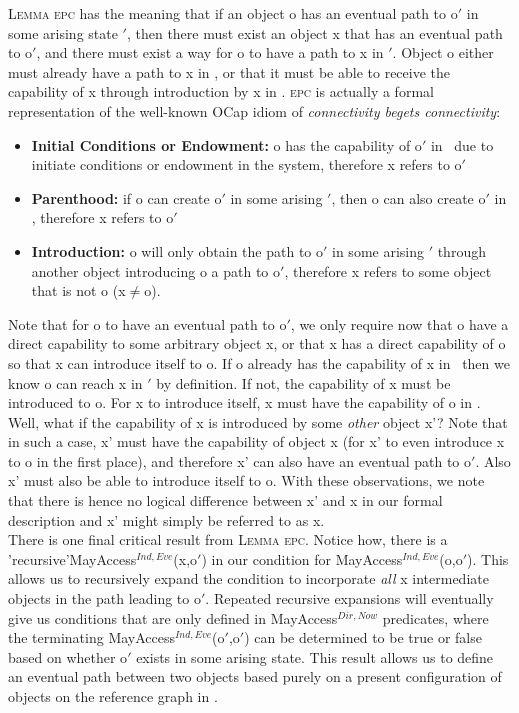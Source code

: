 \documentclass[a4paper,11pt,twoside]{article}
\newcommand{\loneq} {$\neq$}
\newcommand{\losigma}{\text{$\upsigma$}}
\begin{document}
\textsc{Lemma epc} has the meaning that if an object o has an eventual path to o$'$ in some arising state \losigma$'$, then there must exist an object x that has an eventual path to o$'$, and there must exist a way for o to have a path to x in \losigma$'$. Object o either must already have a path to x in \losigma, or that it must be able to receive the capability of x through introduction by x in \losigma. \textsc{epc} is actually a formal representation of the well-known OCap idiom of \textit{connectivity begets connectivity}:

\begin{itemize}
\item \textbf{Initial Conditions or Endowment:} o has the capability of o$'$ in \losigma\ due to initiate conditions or endowment in the system, therefore x refers to o$'$
\item \textbf{Parenthood:} if o can create o$'$ in some arising \losigma$'$, then o can also create o$'$ in \losigma, therefore x refers to o$'$
\item \textbf{Introduction:} o will only obtain the path to o$'$ in some arising \losigma$'$ through another object introducing o a path to o$'$, therefore x refers to some object that is not o (x\loneq o). 
\end{itemize}

Note that for o to have an eventual path to o$'$, we only require now that o have a direct capability to some arbitrary object x, or that x has a direct capability of o so that x can introduce itself to o. If o already has the capability of x in \losigma\ then we know o can reach x in \losigma$'$ by definition. If not, the capability of x must be introduced to o. For x to introduce itself, x must have the capability of o in \losigma.\\

Well, what if the capability of x is introduced by some \textit{other} object x'? Note that in such a case, x' must have the capability of object x (for x' to even introduce x to o in the first place), and therefore x' can also have an eventual path to o$'$. Also x' must also be able to introduce itself to o. With these observations, we note that there is hence no logical difference between x' and x in our formal description and x' might simply be referred to as x.\\

There is one final critical result from \textsc{Lemma epc}.
Notice how, there is a 'recursive'\linebreak MayAccess$^{Ind,Eve}$(x,o$'$) in our condition for MayAccess$^{Ind,Eve}$(o,o$'$).
This allows us to recursively expand the condition to incorporate \textit{all} x intermediate objects in the path leading to o$'$. Repeated recursive expansions will eventually give us conditions that are only defined in MayAccess$^{Dir,Now}$ predicates, where the terminating MayAccess$^{Ind,Eve}$(o$'$,o$'$) can be determined to be true or false based on whether o$'$ exists in some arising state. This result allows us to define an eventual path between two objects based purely on a present configuration of objects on the reference graph in \losigma.\\
\end{document}
